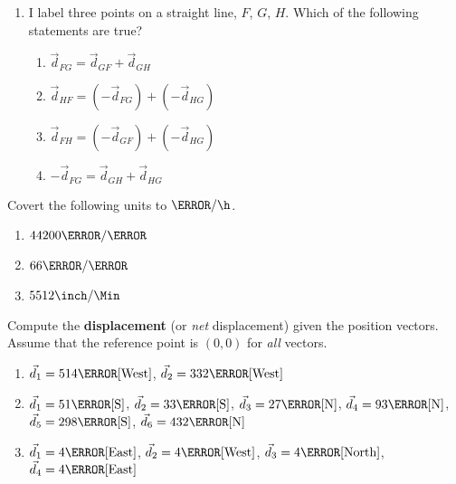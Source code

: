\documentclass[12pt]{article} %
\newcommand{\tx}[1]{\text{#1}}
\begin{document}
\begin{qstn}[2]
\begin{enumerate}
		
		\item I label three points on a straight line, $F$, $G$, $H$. Which of the following statements are true?
			\begin{enumerate}[label = (\alph*)]
				\item $\vec d_{FG} = \vec d_{GF} + \vec d_{GH}$
				\item $\vec d_{HF} = (-\vec d_{FG}) + (-\vec d_{HG})$
				\item $\vec d_{FH} = (-\vec d_{GF}) + (-\vec d_{HG})$
				\item $-\vec d_{FG} = \vec d_{GH} + \vec d_{HG}$
			\end{enumerate}
	\end{enumerate}
	
\end{qstn}

\begin{qstn}[3]
Covert the following units to $\km / \h$. 
\begin{enumerate}[label = (\alph*)]
	\item $44200 \m / \s$
	\vspace*{5cm}

	\item $66 \km / \s$
	\vspace*{5cm}

	\item $5512 \inch / \Min$
\end{enumerate}


\end{qstn}

\begin{qstn}[4]
	Compute the \textbf{displacement} (or \emph{net} displacement) given the position vectors. Assume that the reference point is $(0,0)$ for \emph{all} vectors.
    \begin{enumerate}[label=(\alph*)]
        \item $\vec d_1 = 514 \tx{\m}[\tx{West}]$, $\vec d_2 = 332 \tx{\m}[\tx{West}]$
         \vspace*{4cm}
        \item $\vec d_1 = 51 \tx{\m}[\tx{S}]$, $\vec d_2 = 33 \tx{\m}[\tx{S}]$, $\vec d_3 = 27 \tx{\m}[\tx{N}]$, $\vec d_4 = 93 \tx{\m}[\tx{N}]$,$\vec d_5 = 298 \tx{\m}[\tx{S}]$, $\vec d_6 = 432 \tx{\m}[\tx{N}]$
        \vspace*{4cm}
        \item $\vec d_1 = 4\tx{\m}[\tx{East}]$, $\vec d_2 = 4\tx{\m}[\tx{West}]$, $\vec d_3 = 4\tx{\m}[\tx{North}]$, $\vec d_4 = 4\tx{\m}[\tx{East}]$
		\vspace*{5cm}
    \end{enumerate}
\end{qstn}
\end{document}
